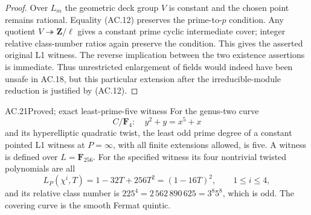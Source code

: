 \begin{proof}
Over $L_m$ the geometric deck group $V$ is constant and the chosen point
remains rational.  Equality (AC.12) preserves the prime-to-$p$ condition.
Any quotient $V\twoheadrightarrow\mathbf Z/\ell$ gives a constant
prime cyclic intermediate cover; integer relative class-number ratios
again preserve the condition.  This gives the asserted original L1
witness.  The reverse implication between the two existence assertions
is immediate.  Thus unrestricted enlargement of fields would indeed
have been unsafe in AC.18, but this particular extension after the
irreducible-module reduction is justified by (AC.12).
\end{proof}

\begin{claim}{AC.21}{Proved; exact least-prime-five witness}
For the genus-two curve
\[
                  C/\mathbf F_4:\quad y^2+y=x^5+x
\]
and its hyperelliptic quadratic twist, the least odd prime degree of
a constant pointed L1 witness at $P=\infty$, with all finite extensions
allowed, is five.  A witness is defined over $L=\mathbf F_{256}$.
For the specified witness its four nontrivial twisted polynomials are
all
\[
               L_P(\chi^i,T)=1-32T+256T^2=(1-16T)^2,
                 \qquad 1\le i\le4,
\]
and its relative class number is
$225^4=2\,562\,890\,625=3^8 5^8$, which is odd.
The covering curve is the smooth Fermat quintic.
\end{claim}
